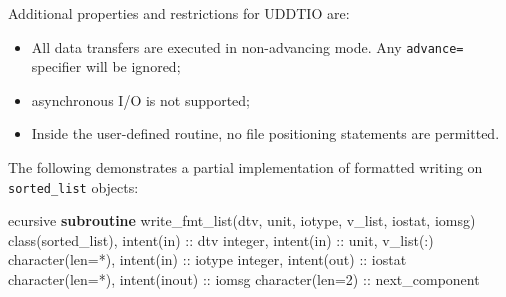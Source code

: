 \documentclass[
  paper=a4,
  ,captions=tableheading
]{scrartcl}
\newenvironment{Shaded}{\begin{snugshade}}{\end{snugshade}}
\newcommand{\DataTypeTok}[1]{\textcolor[rgb]{0.13,0.29,0.53}{#1}}
\newcommand{\KeywordTok}[1]{\textcolor[rgb]{0.13,0.29,0.53}{\textbf{#1}}}
\newcommand{\NormalTok}[1]{#1}
\providecommand{\tightlist}{%
  \setlength{\itemsep}{0pt}\setlength{\parskip}{0pt}}
\begin{document}
Additional properties and restrictions for UDDTIO are:

\begin{itemize}
\tightlist
\item
  All data transfers are executed in non-advancing mode. Any
  \texttt{advance=} specifier will be ignored;
\item
  asynchronous I/O is not supported;
\item
  Inside the user-defined routine, no file positioning statements are
  permitted.
\end{itemize}

The following demonstrates a partial implementation of formatted writing
on \texttt{sorted\_list} objects:

\begin{Shaded}
\begin{Highlighting}[]
\NormalTok{ecursive }\KeywordTok{subroutine}\NormalTok{ write\_fmt\_list(dtv, unit, iotype, v\_list, iostat, iomsg)}
  \DataTypeTok{class(sorted\_list)}\NormalTok{, }\DataTypeTok{intent(in)} \DataTypeTok{::}\NormalTok{ dtv}
  \DataTypeTok{integer}\NormalTok{, }\DataTypeTok{intent(in)} \DataTypeTok{::}\NormalTok{ unit, v\_list(:)}
  \DataTypeTok{character(len=*)}\NormalTok{, }\DataTypeTok{intent(in)} \DataTypeTok{::}\NormalTok{ iotype}
  \DataTypeTok{integer}\NormalTok{, }\DataTypeTok{intent(out)} \DataTypeTok{::}\NormalTok{ iostat}
  \DataTypeTok{character(len=*)}\NormalTok{, }\DataTypeTok{intent(inout)} \DataTypeTok{::}\NormalTok{ iomsg}
  \DataTypeTok{character(len=2)} \DataTypeTok{::}\NormalTok{ next\_component}


\end{Highlighting}
\end{Shaded}
\end{document}
